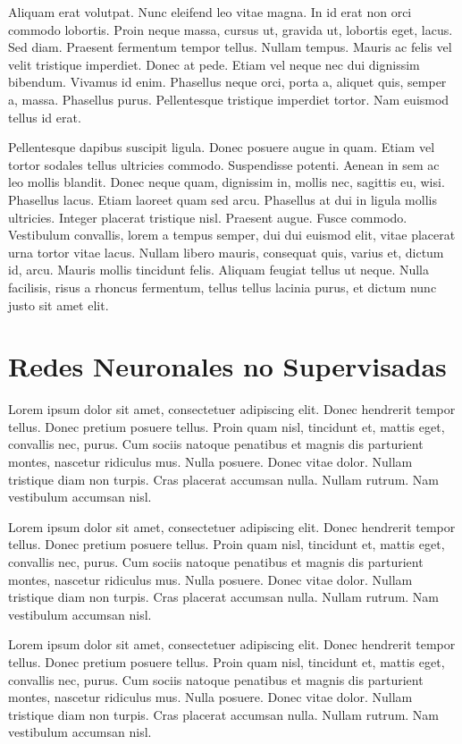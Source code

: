 Aliquam erat volutpat.  Nunc eleifend leo vitae magna.  In id erat non
orci commodo lobortis.  Proin neque massa, cursus ut, gravida ut,
lobortis eget, lacus.  Sed diam.  Praesent fermentum tempor tellus.
Nullam tempus.  Mauris ac felis vel velit tristique imperdiet.  Donec
at pede.  Etiam vel neque nec dui dignissim bibendum.  Vivamus id
enim.  Phasellus neque orci, porta a, aliquet quis, semper a, massa.
Phasellus purus.  Pellentesque tristique imperdiet tortor.  Nam
euismod tellus id erat.

Pellentesque dapibus suscipit ligula.  Donec posuere augue in quam.
Etiam vel tortor sodales tellus ultricies commodo.  Suspendisse
potenti.  Aenean in sem ac leo mollis blandit.  Donec neque quam,
dignissim in, mollis nec, sagittis eu, wisi.  Phasellus lacus.  Etiam
laoreet quam sed arcu.  Phasellus at dui in ligula mollis ultricies.
Integer placerat tristique nisl.  Praesent augue.  Fusce commodo.
Vestibulum convallis, lorem a tempus semper, dui dui euismod elit,
vitae placerat urna tortor vitae lacus.  Nullam libero mauris,
consequat quis, varius et, dictum id, arcu.  Mauris mollis tincidunt
felis.  Aliquam feugiat tellus ut neque.  Nulla facilisis, risus a
rhoncus fermentum, tellus tellus lacinia purus, et dictum nunc justo
sit amet elit.


\section{Redes Neuronales no Supervisadas}

Lorem ipsum dolor sit amet, consectetuer adipiscing elit.  Donec
hendrerit tempor tellus.  Donec pretium posuere tellus.  Proin quam
nisl, tincidunt et, mattis eget, convallis nec, purus.  Cum sociis
natoque penatibus et magnis dis parturient montes, nascetur ridiculus
mus.  Nulla posuere.  Donec vitae dolor.  Nullam tristique diam non
turpis.  Cras placerat accumsan nulla.  Nullam rutrum.  Nam vestibulum
accumsan nisl.

Lorem ipsum dolor sit amet, consectetuer adipiscing elit.  Donec
hendrerit tempor tellus.  Donec pretium posuere tellus.  Proin quam
nisl, tincidunt et, mattis eget, convallis nec, purus.  Cum sociis
natoque penatibus et magnis dis parturient montes, nascetur ridiculus
mus.  Nulla posuere.  Donec vitae dolor.  Nullam tristique diam non
turpis.  Cras placerat accumsan nulla.  Nullam rutrum.  Nam vestibulum
accumsan nisl.

Lorem ipsum dolor sit amet, consectetuer adipiscing elit.  Donec
hendrerit tempor tellus.  Donec pretium posuere tellus.  Proin quam
nisl, tincidunt et, mattis eget, convallis nec, purus.  Cum sociis
natoque penatibus et magnis dis parturient montes, nascetur ridiculus
mus.  Nulla posuere.  Donec vitae dolor.  Nullam tristique diam non
turpis.  Cras placerat accumsan nulla.  Nullam rutrum.  Nam vestibulum
accumsan nisl.


